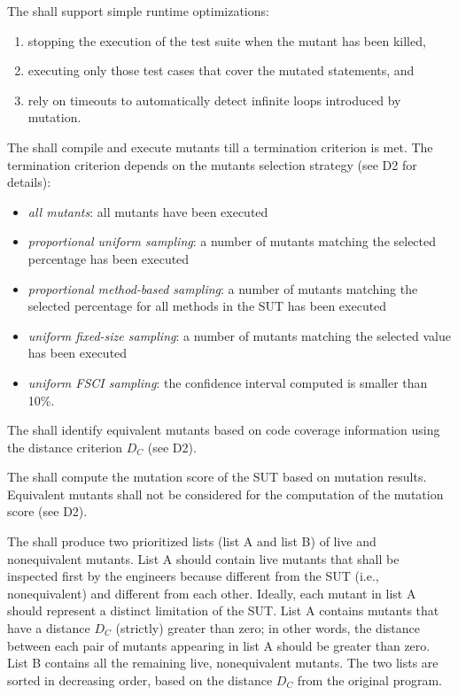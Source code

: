 \RQ{} The \FAQAS shall support simple runtime optimizations:
\begin{enumerate}
	\item stopping the execution of the test suite when the mutant has been killed,
	\item executing only those test cases that cover the mutated statements, and
	\item rely on timeouts to automatically detect infinite loops introduced by mutation.
\end{enumerate}


\RQ{} The \FAQAS shall compile and execute mutants till a termination criterion is met. The termination criterion depends on the mutants selection strategy (see D2 for details):
\begin{itemize}
	\item \emph{all mutants}: all mutants have been executed
	\item \emph{proportional uniform sampling}: a number of mutants matching the selected percentage has been executed
	\item \emph{proportional method-based sampling}: a number of mutants matching the selected percentage for all methods in the SUT has been executed
	\item \emph{uniform fixed-size sampling}: a number of mutants matching the selected value has been executed
	\item \emph{uniform FSCI sampling}: the confidence interval computed is smaller than 10\%.
\end{itemize}


\RQ{} The \FAQAS shall identify equivalent mutants based on code coverage information using the distance criterion $D_C$ (see D2).


\RQ{} The \FAQAS shall compute the mutation score of the SUT based on mutation results. Equivalent mutants shall not be considered for the computation of the mutation score (see D2).

\RQ{} The \FAQAS shall produce two prioritized lists (list A and list B) of live and nonequivalent mutants.
List A should contain live mutants that shall be inspected first by the engineers because different from the SUT (i.e., nonequivalent) and different from each other. Ideally, each mutant in list A should represent a distinct limitation of the SUT.
List A contains mutants that have a distance $D_C$ (strictly) greater than zero; in other words, the distance between each pair of mutants appearing in list A should be greater than zero.
List B contains all the remaining live, nonequivalent mutants.
The two lists are sorted in decreasing order, based on the distance $D_C$ from the original program.

